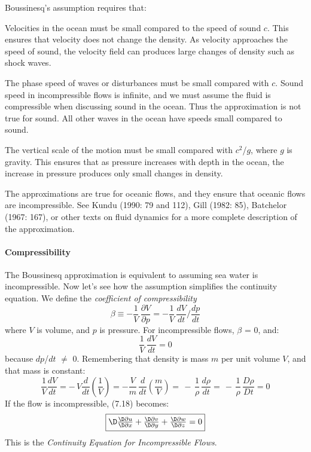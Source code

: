 Boussinesq's assumption requires that:
\begin{enumerate}
\vitem Velocities in the ocean must be small compared to the speed of
sound $c$. This
ensures that velocity does not change the density. As velocity
approaches the speed of sound, the velocity field can produces large
changes of density such as shock waves.

\vitem The phase speed of waves or disturbances must be small compared
with $c$.  Sound speed in
incompressible flows is infinite, and we must assume the fluid is
compressible when discussing sound in the ocean. Thus the
approximation is not true for sound. All other waves in the ocean have
speeds small compared to sound.

\vitem The vertical scale of the motion must be small compared with
$c^2$/$g$, where $g$ is gravity. This ensures that as pressure
increases with depth in the ocean, the increase in pressure produces
only small changes in density.
\end{enumerate}

The approximations are true for oceanic flows, and they ensure that
oceanic flows are incompressible. See Kundu (1990: 79 and 112), Gill
(1982: 85), Batchelor (1967: 167), or other texts on fluid dynamics
for a more complete description of the approximation.

\paragraph{Compressibility}
The Boussinesq
approximation is equivalent to assuming sea water is
incompressible. Now let's see how the assumption simplifies the
continuity equation. We define the \textit{coefficient of
  compressibility}
\begin{displaymath}
\beta \equiv -\frac{1}{V}\,\frac{\partial{V}}{\partial{p}} =
-\frac{1}{V}\,\frac{dV}{dt}\Big/\frac{dp}{dt}
\end{displaymath}
where $V$ is volume, and $p$ is pressure. For incompressible flows,
$\beta$ = 0, and:
\begin{displaymath}
\frac{1}{V}\,\frac{dV}{dt} = 0
\end{displaymath}
because $dp$/$dt$ $\not=$ 0. Remembering that density is mass $m$ per
unit volume $V$, and that mass is constant:
\begin{displaymath}
\frac{1}{V}\frac{dV}{dt} = -\,V\frac{d}{dt}\left(\frac{1}{V}\right) =
- \frac{V}{m}\,\frac{d}{dt}\left(\frac{m}{V}\right)
=\,-\,\frac{1}{\rho}\,\frac{d\rho}{dt} =\,-\,\frac{1}{\rho}\, \frac{D\rho}{Dt} = 0
\end{displaymath}
If the flow is incompressible, (7.18) becomes:
\begin{equation}
\fbox{$ \D
\frac{\D\partial{u}}{\D\partial{x}} + \frac{\D\partial{v}}{\D\partial{y}} + \frac{\D\partial{w}}{\D\partial{z}} = 0 $}
\end{equation}
This is the  \textit{Continuity Equation
  for Incompressible Flows}.

